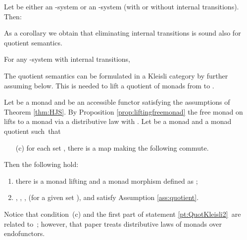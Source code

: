 \documentclass[oribibl,envcountsame,envcountsect,runningheads]{llncs}
\renewcommand{\>}{\rangle}
\begin{document}
\newcommand{\propfactQuotient}{ Let  be either an -system or an -system (with or without internal transitions). Then:
}
\begin{proposition} \label{prop:factQuotient}
\propfactQuotient
\end{proposition}
As a corollary we obtain that eliminating internal transitions is sound also for quotient semantics.
\newcommand{\corSoundQuot}{
For any -system  with internal transitions,

}
\begin{corollary} \label{for:sound-quot}
\corSoundQuot
\end{corollary}
The quotient semantics can be formulated in a Kleisli category  by further assuming  below. This is needed to lift a quotient of monads from  to .

\newcommand{\thquotcomparewithHJS}{Let  be a monad and  be an accessible functor satisfying the assumptions of Theorem \ref{thm:HJS}. By Proposition \ref{prop:liftingfreemonad} the free monad  on  lifts to a monad  via a distributive law  with . Let  be a monad and  a monad quotient such~that
\begin{itemize}
\item[(c)] for each set , there is a map
  making the following commute.
 
 \end{itemize}
Then the following hold:
\begin{enumerate}
\item there is a monad  lifting  and a monad morphism  defined as ; \label{pt:QuotKleisli2}
 \item , , ,  (for a given set ),  and  satisfy Assumption \ref{ass:quotient}. \label{pt:QuotKleisli3}
     \end{enumerate}}
\begin{theorem}\label{th:quotcomparewithHJS}
\thquotcomparewithHJS
\end{theorem}

Notice that condition~(c) and the first part of statement \ref{pt:QuotKleisli2}~are
related to~\cite[Theorem~1]{BHKR13}; however, that paper treats distributive
laws of monads over endofunctors.
\end{document}
